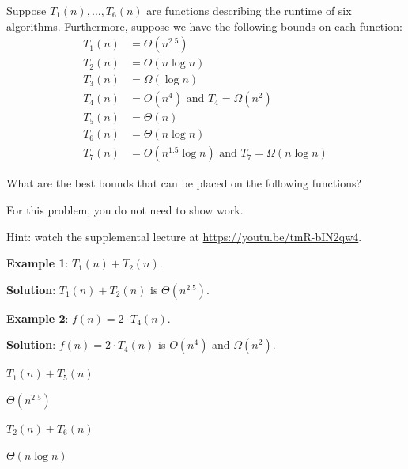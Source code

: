 \begin{prob}

    Suppose $T_1(n), \ldots, T_6(n)$ are functions
    describing the runtime of six algorithms. Furthermore, suppose we
    have the following bounds on each function:
    \begin{align*}
        T_1(n) &= \Theta(n^{2.5})\\
        T_2(n) &= O(n \log n)\\
        T_3(n) &= \Omega(\log n)\\
        T_4(n) &= O(n^4) \text{ and } T_4 = \Omega(n^2)\\
        T_5(n) &= \Theta(n)\\
        T_6(n) &= \Theta(n \log{n})\\
        T_7(n) &= O(n^{1.5} \log n) \text{ and } T_7 = \Omega(n \log{n})
    \end{align*}

    What are the best bounds that can be placed on the following functions?

    For this problem, you do not need to show work.

    Hint: watch the supplemental lecture at \url{https://youtu.be/tmR-bIN2qw4}.

    \textbf{Example 1}: $T_1(n) + T_2(n)$.

    \textbf{Solution}: $T_1(n) + T_2(n)$ is $\Theta(n^{2.5})$.
    
    \textbf{Example 2}: $f(n) = 2 \cdot T_4(n)$.

    \textbf{Solution}: $f(n) = 2 \cdot T_4(n)$ is $O(n^4)$ and $\Omega(n^2)$.



    \begin{subprobset}

        \begin{subprob}
            $T_1(n) + T_5(n)$

            \begin{soln}
                $\Theta(n^{2.5})$
            \end{soln}
        \end{subprob}

        \begin{subprob}
            $T_2(n) + T_6(n)$

            \begin{soln}
                $\Theta(n \log n)$
            \end{soln}
        \end{subprob}


\end{subprobset}
\end{prob}
